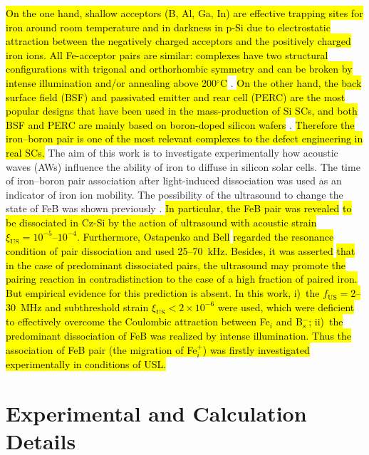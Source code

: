 \documentclass[sn-mathphys]{sn-jnl}%
\theoremstyle{thmstyleone}%
\theoremstyle{thmstyletwo}%
\theoremstyle{thmstylethree}%
\begin{document}
\hl{ On the one hand, shallow acceptors (B, Al, Ga, In) are effective trapping sites for iron around room temperature
and in darkness in p-Si due to electrostatic attraction between the negatively charged
acceptors and the positively charged iron ions.
All Fe-acceptor pairs are similar:
complexes have two structural configurations
with trigonal and orthorhombic symmetry and can be broken by 
intense illumination and/or annealing above 200$^\circ$C} \cite{Istratov1999,FeBKinAPL2013}.
\hl{ On the other hand, the back surface field (BSF) and passivated emitter and rear cell (PERC)
are the most popular designs that have been used in the mass-production of Si SCs,
and both BSF and PERC are mainly  based on boron-doped silicon wafers }\cite{SCRev2020,GreenRew2019}.
\hl{ Therefore the iron--boron pair is one of the most relevant complexes to the defect engineering in real SCs.}
The aim of this work is to investigate experimentally how acoustic waves (AWs) influence the ability of iron to diffuse in silicon solar cells.
The time of iron--boron pair association after  light-induced dissociation was used as an indicator of iron ion mobility.
The possibility of the ultrasound to  change the state of FeB was shown previously  \cite{Ostapenko1994APL,Ostapenko1995}.
\hl{
In particular, the
FeB pair was revealed} \cite{Ostapenko1995}
\hl{ to be dissociated in Cz-Si by the action of ultrasound with acoustic strain $\xi_\mathrm{US}=10^{-5}$--$10^{-4}$.
Furthermore, Ostapenko and Bell} \cite{Ostapenko1995} \hl{regarded the resonance condition of pair dissociation and used 25--70~kHz.
Besides, it was asserted} \cite{Ostapenko1994APL} \hl{that in the case of
predominant dissociated pairs, the ultrasound may promote the pairing reaction in contradistinction to the case of a
high fraction of paired iron.
But  empirical evidence  for this prediction  is absent.
In this work,
i)~the $f_\mathrm{US}=$2--30~MHz and subthreshold strain $\xi_\mathrm{US}<2\times10^{-6}$ were used, which were deficient to effectively overcome the Coulombic attraction between Fe$_i$ and B$_s^-$;
ii)~the predominant  dissociation of FeB was realized by intense illumination.
Thus the association of FeB pair (the migration  of Fe$_i^+$) was firstly investigated experimentally in conditions of USL.}


\section{Experimental and Calculation Details}
\label{sec:1}
\end{document}
